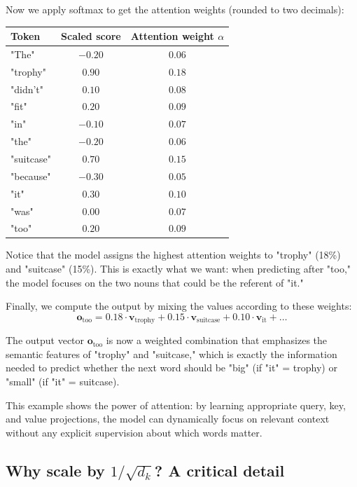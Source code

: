 Now we apply softmax to get the attention weights (rounded to two decimals):
\begin{center}
\begin{tabular}{lcc}
\toprule
\textbf{Token} & \textbf{Scaled score} & \textbf{Attention weight} $\alpha$ \\
\midrule
"The" & $-0.20$ & $0.06$ \\
"trophy" & $0.90$ & $0.18$ \\
"didn't" & $0.10$ & $0.08$ \\
"fit" & $0.20$ & $0.09$ \\
"in" & $-0.10$ & $0.07$ \\
"the" & $-0.20$ & $0.06$ \\
"suitcase" & $0.70$ & $0.15$ \\
"because" & $-0.30$ & $0.05$ \\
"it" & $0.30$ & $0.10$ \\
"was" & $0.00$ & $0.07$ \\
"too" & $0.20$ & $0.09$ \\
\bottomrule
\end{tabular}
\end{center}

Notice that the model assigns the highest attention weights to "trophy" (18\%) and "suitcase" (15\%). This is exactly what we want: when predicting after "too," the model focuses on the two nouns that could be the referent of "it."

Finally, we compute the output by mixing the values according to these weights:
\begin{equation}
\mathbf{o}_{\text{too}} = 0.18 \cdot \mathbf{v}_{\text{trophy}} + 0.15 \cdot \mathbf{v}_{\text{suitcase}} + 0.10 \cdot \mathbf{v}_{\text{it}} + \ldots
\end{equation}

The output vector $\mathbf{o}_{\text{too}}$ is now a weighted combination that emphasizes the semantic features of "trophy" and "suitcase," which is exactly the information needed to predict whether the next word should be "big" (if "it" = trophy) or "small" (if "it" = suitcase).

This example shows the power of attention: by learning appropriate query, key, and value projections, the model can dynamically focus on relevant context without any explicit supervision about which words matter.

\subsection{Why scale by \texorpdfstring{$1/\sqrt{d_k}$}{1/sqrt(d\_k)}? A critical detail}
\label{sec:scaled_attention}

